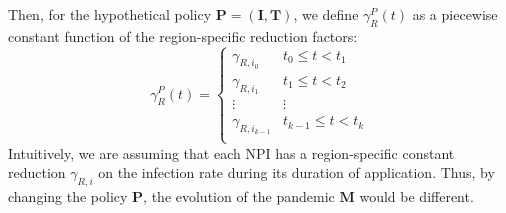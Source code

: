 \documentclass[msom,blindrev]{informs3} %
\begin{document}

Then, for the hypothetical policy $\bm{P}=(\bm{I},\bm{T})$, we define $\gamma_R^P(t)$ as a piecewise constant function of the region-specific reduction factors:
\begin{equation}
    \gamma_R^P(t)=\begin{cases}
    \gamma_{R,i_0} & t_0\leq t<t_1\\
    \gamma_{R,i_1} & t_1\leq t<t_2\\ 
    \vdots & \vdots \\
    \gamma_{R,i_{k-1}} & t_{k-1}\leq t<t_k\\ 
    \end{cases}
\end{equation}
Intuitively, we are assuming that each NPI has a region-specific constant reduction $\gamma_{R,i}$ on the infection rate during its duration of application. Thus, by changing the policy $\bm{P}$, the evolution of the pandemic $\bm{M}$ would be different. 
\end{document}

